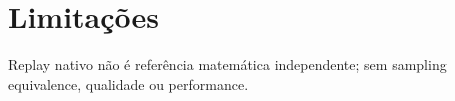 \section{Limitações}
Replay nativo não é referência matemática independente; sem sampling equivalence, qualidade ou performance.
